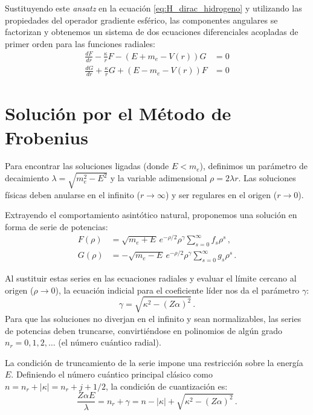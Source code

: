 Sustituyendo este \textit{ansatz} en la ecuación \eqref{eq:H_dirac_hidrogeno} y utilizando las propiedades del operador gradiente esférico, las componentes angulares se factorizan y obtenemos un sistema de dos ecuaciones diferenciales acopladas de primer orden para las funciones radiales:
\begin{align}
    \frac{dF}{dr} - \frac{\kappa}{r}F - \left( E + m_e - V(r) \right)G &= 0 \label{eq:radial1} \\
    \frac{dG}{dr} + \frac{\kappa}{r}G + \left( E - m_e - V(r) \right)F &= 0 \label{eq:radial2}
\end{align}

\section{Solución por el Método de Frobenius}

Para encontrar las soluciones ligadas (donde $E < m_e$), definimos un parámetro de decaimiento $\lambda = \sqrt{m_e^2 - E^2}$ y la variable adimensional $\rho = 2\lambda r$. Las soluciones físicas deben anularse en el infinito ($r \to \infty$) y ser regulares en el origen ($r \to 0$).

Extrayendo el comportamiento asintótico natural, proponemos una solución en forma de serie de potencias:
\begin{align}
    F(\rho) &= \sqrt{m_e + E} \, e^{-\rho/2} \rho^\gamma \sum_{s=0}^{\infty} f_s \rho^s \, , \\
    G(\rho) &= -\sqrt{m_e - E} \, e^{-\rho/2} \rho^\gamma \sum_{s=0}^{\infty} g_s \rho^s \, .
\end{align}

Al sustituir estas series en las ecuaciones radiales y evaluar el límite cercano al origen ($\rho \to 0$), la ecuación indicial para el coeficiente líder nos da el parámetro $\gamma$:
\begin{equation}
    \gamma = \sqrt{\kappa^2 - (Z\alpha)^2} \, .
\end{equation}
Para que las soluciones no diverjan en el infinito y sean normalizables, las series de potencias deben truncarse, convirtiéndose en polinomios de algún grado $n_r = 0, 1, 2, \dots$ (el número cuántico radial). 

La condición de truncamiento de la serie impone una restricción sobre la energía $E$. Definiendo el número cuántico principal clásico como $n = n_r + |\kappa| = n_r + j + 1/2$, la condición de cuantización es:
\begin{equation}
    \frac{Z\alpha E}{\lambda} = n_r + \gamma = n - |\kappa| + \sqrt{\kappa^2 - (Z\alpha)^2} \, .
\end{equation}

